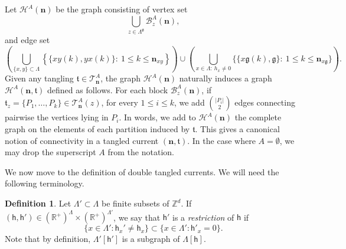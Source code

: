 \documentclass[11pt,a4paper]{article}
\theoremstyle{definition}
\newtheorem{definition}[theorem]{Definition}
\numberwithin{equation}{section}
\newcommand\n{\mathbf{n}}
\newcommand\fg{\mathfrak{g}}
\newcommand\ft{\mathfrak{t}}
\begin{document}
Let $\mathcal{H}^A(\n)$ be the graph consisting of vertex set 
\begin{equation}
\bigcup_{z \in \Lambda^\fg} \mathcal{B}^A_z(\n),
\end{equation}
and edge set 
\begin{equation}
\left(\bigcup_{\lbrace x,y\rbrace\subset \Lambda}\left\lbrace \lbrace xy(k),yx(k) \rbrace: \: 1\leq k \leq \n_{xy}\right\rbrace\right)\cup\left(\bigcup_{x\in \Lambda : \:h_x\neq 0}\lbrace \lbrace x\fg(k),\fg\rbrace: \: 1\leq k\leq \n_{x\fg}\rbrace\right).	
\end{equation}
Given any tangling $\ft \in \mathcal{T}_{\n}^A$, the graph $\mathcal{H}^A(\n)$  naturally induces a graph $\mathcal{H}^A(\n,\ft)$ defined as follows. For each block $\mathcal{B}_z^A(\n)$, if $\ft_z=\{P_1,\ldots,P_k\}\in \mathcal{T}_\n^A(z)$, for every $1\leq i \leq k$, we add $\binom{|P_i|}{2}$ edges connecting pairwise the vertices lying in $P_i$. In words, we add to $\mathcal H^A(\n)$ the complete graph on the elements of each partition induced by $\ft$.
 This gives a canonical notion of connectivity in a tangled current $(\n,\ft)$.
In the case where $A=\emptyset$, we may drop the superscript $A$ from the notation.

We now move to the definition of double tangled currents. We will need the following terminology. 
\begin{definition} Let $\Lambda'\subset\Lambda$ be finite subsets of $\mathbb Z^d$. If $(\mathsf{h},\mathsf{h}')\in (\mathbb R^+)^\Lambda\times (\mathbb R^+)^{\Lambda'}$, we say that $\mathsf{h}'$ is a \emph{restriction} of $\mathsf{h}$ if 
\begin{equation}
    \{ x \in \Lambda' : \mathsf{h}_x' \neq \mathsf{h}_x\}\subset \{x \in \Lambda': \mathsf{h}'_x=0\}.
\end{equation}
 Note that by definition, $\Lambda'[\mathsf{h}']$ is a subgraph of $\Lambda[\mathsf{h}]$.
\end{definition}
\end{document}
